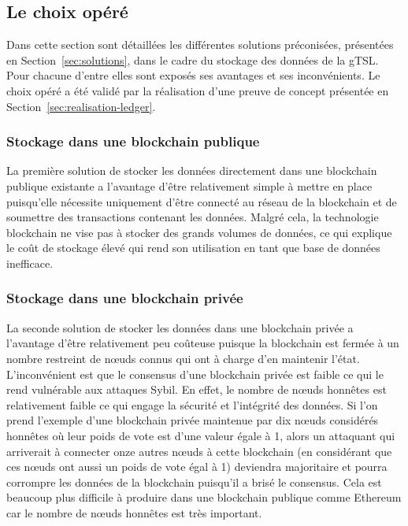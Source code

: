 \documentclass{tnreport}
\begin{document}
\subsection{Le choix opéré}
\label{sec:choice}

Dans cette section sont détaillées les différentes solutions préconisées, présentées en Section~\ref{sec:solutions}, dans le cadre du stockage des données de la gTSL. Pour chacune d'entre elles sont exposés ses avantages et ses inconvénients.
Le choix opéré a été validé par la réalisation d'une preuve de concept présentée en Section~\ref{sec:realisation-ledger}.

\subsubsection{Stockage dans une blockchain publique}

La première solution de stocker les données directement dans une blockchain publique existante a l'avantage d'être relativement simple à mettre en place puisqu'elle nécessite uniquement d'être connecté au réseau de la blockchain et de soumettre des transactions contenant les données. Malgré cela, la technologie blockchain ne vise pas à stocker des grands volumes de données, ce qui explique le coût de stockage élevé qui rend son utilisation en tant que base de données inefficace.

\subsubsection{Stockage dans une blockchain privée}

La seconde solution de stocker les données dans une blockchain privée a l'avantage d'être relativement peu coûteuse puisque la blockchain est fermée à un nombre restreint de nœuds connus qui ont à charge d'en maintenir l'état. L'inconvénient est que le consensus d'une blockchain privée est faible ce qui le rend vulnérable aux attaques Sybil. En effet, le nombre de nœuds honnêtes est relativement faible ce qui engage la sécurité et l'intégrité des données. Si l'on prend l'exemple d'une blockchain privée maintenue par dix nœuds considérés honnêtes où leur poids de vote est d'une valeur égale à 1, alors un attaquant qui arriverait à connecter onze autres nœuds à cette blockchain (en considérant que ces nœuds ont aussi un poids de vote égal à 1) deviendra majoritaire et pourra corrompre les données de la blockchain puisqu'il a brisé le consensus. Cela est beaucoup plus difficile à produire dans une blockchain publique comme Ethereum car le nombre de nœuds honnêtes est très important.
\end{document}
